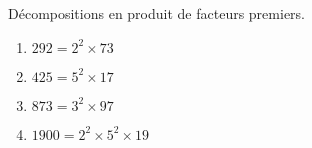    Décompositions en produit de facteurs premiers.

    \begin{enumerate}
        \item $292=2^2\times 73$
        \item $425=5^2\times 17$
        \item $873=3^2\times 97$
        \item $\num{1900}=2^2\times 5^2 \times 19$
    \end{enumerate}

